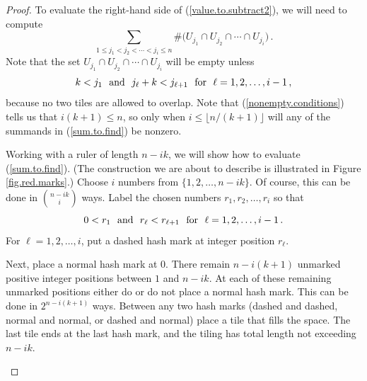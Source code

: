 \documentclass[11pt,reqno]{amsart}
\theoremstyle{plain}
\numberwithin{equation}{section}
\begin{document}
\begin{proof}
To evaluate the right-hand side of  (\ref{value.to.subtract2}),
we will need to  compute
\begin{equation}\label{sum.to.find}
\sum_{1\leq j_1<j_2<\cdots<j_i\leq n}
\#\Big( U_{j_1}\cap U_{j_2}\cap \cdots \cap U_{j_i} \Big)
\,.
\end{equation}
Note that the set  $U_{j_1}\cap U_{j_2}\cap \cdots \cap U_{j_i} $
will be empty unless 
\begin{equation}\label{nonempty.conditions}
k < j_1 \hbox{\rm\ \ and\ \ }
j_\ell+k  < j_{\ell+1}
\hbox{\rm \ \ for\ \ }\ell = 1,2,\dots,i-1
\,,
\end{equation}
because no two  tiles are allowed to overlap. Note that (\ref{nonempty.conditions})
tells us that $i(k+1)\leq n$, so only  when  $i\leq \lfloor n/(k+1) \rfloor$ will 
any of the summands in 
(\ref{sum.to.find}) be nonzero.

\medskip
Working with a ruler of length $n-ik$, we will show how to
evaluate (\ref{sum.to.find}). (The construction we are about to 
describe is illustrated in Figure \ref{fig.red.marks}.)
Choose $i$ numbers from $\{1,2,\dots,n-ik\}$.
Of course,
this can be done in $\binom{n-ik}{ i}$ ways. Label the
chosen numbers  $r_1,r_2,\dots,r_i$ so that   
\begin{equation}\label{conditions3}
0<  r_1 \hbox{\rm\ \ and\ \ }
r_\ell < r_{\ell+1}
\hbox{\rm \ \ for\ \ }\ell = 1,2,\dots,i-1
\,.
\end{equation}
For $\ell = 1, 2,\dots, i$, put a dashed hash mark at 
integer position $r_\ell$.

Next, place a normal hash mark at 0. 
There remain $n-i(k+1)$ unmarked positive integer positions between $1$ and $n-ik$.
At each of these remaining unmarked positions either do or do not place a normal hash mark.  This can be done in $2^{n-i(k+1)}$  ways.
Between any two  hash marks (dashed and dashed, normal and normal, or dashed and normal) place a tile that fills the space. 
The last tile  ends at the last hash mark, and the tiling has total length not exceeding $n-ik$.  




\begin{figure}[htp]
\begin{center}
\end{center}
\end{figure}
\end{proof}
\end{document}
